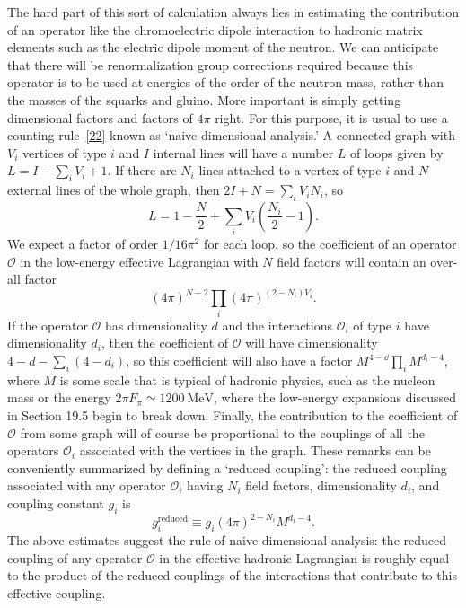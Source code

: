 The hard part of this sort of calculation always lies in estimating the
contribution of an operator like the chromoelectric dipole interaction to
hadronic matrix elements such as the electric dipole moment of the
neutron. We can anticipate that there will be renormalization group
corrections required because this operator is to be used at energies of
the order of the neutron mass, rather than the masses of the squarks and
gluino. More important is simply getting dimensional factors and factors
of \(4\pi\) right. For this purpose, it is usual to use a counting
rule~\hyperref[ch28-ref-22]{[22]} known as `naive dimensional analysis.'
A connected graph with \(V_i\) vertices of type \(i\) and \(I\) internal
lines will have a number \(L\) of loops given by
\(L=I-\sum_iV_i+1\). If there are \(N_i\) lines attached to a vertex of
type \(i\) and \(N\) external lines of the whole graph, then
\(2I+N=\sum_iV_iN_i\), so
\[
  L=1-\frac{N}{2}
  +\sum_iV_i\left(\frac{N_i}{2}-1\right).
\]
We expect a factor of order \(1/16\pi^2\) for each loop, so the coefficient
of an operator \(\mathcal{O}\) in the low-energy effective Lagrangian with
\(N\) field factors will contain an over-all factor
\[
  (4\pi)^{N-2}
  \prod_i(4\pi)^{(2-N_i)V_i}.
\]
If the operator \(\mathcal{O}\) has dimensionality \(d\) and the
interactions \(\mathcal{O}_i\) of type \(i\) have dimensionality \(d_i\),
then the coefficient of \(\mathcal{O}\) will have dimensionality
\(4-d-\sum_i(4-d_i)\), so this coefficient will also have a factor
\(M^{4-\dd}\prod_iM^{d_i-4}\), where \(M\) is some scale that is typical
of hadronic physics, such as the nucleon mass or the energy
\(2\pi F_\pi\simeq1200\ \mathrm{MeV}\), where the low-energy expansions
discussed in Section 19.5 begin to break down. Finally, the contribution
to the coefficient of \(\mathcal{O}\) from some graph will of course be
proportional to the couplings of all the operators \(\mathcal{O}_i\)
associated with the vertices in the graph. These remarks can be
conveniently summarized by defining a `reduced coupling': the reduced
coupling associated with any operator \(\mathcal{O}_i\) having \(N_i\)
field factors, dimensionality \(d_i\), and coupling constant \(g_i\) is
\begin{equation}
  g_i^{\mathrm{reduced}}
  \equiv
  g_i(4\pi)^{2-N_i}M^{d_i-4}.
  \tag{28.4.16}\label{eq:28.4.16}
\end{equation}
The above estimates suggest the rule of naive dimensional analysis: the
reduced coupling of any operator \(\mathcal{O}\) in the effective hadronic
Lagrangian is roughly equal to the product of the reduced couplings of the
interactions that contribute to this effective coupling.

